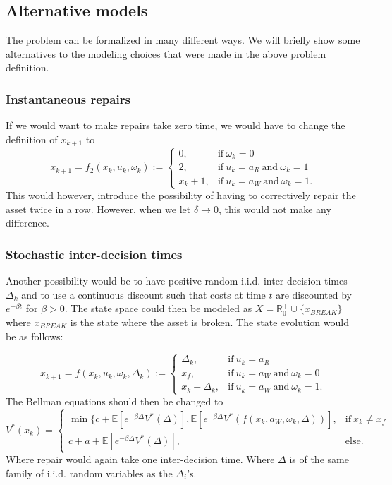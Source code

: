 \subsection{Alternative models}
The problem can be formalized in many different ways.
We will briefly show some alternatives to the modeling choices that were made in the above problem definition.
\subsubsection{Instantaneous repairs}
If we would want to make repairs take zero time, we would have to change the definition of $x_{k+1}$ to 
$$
x_{k+1}=f_2(x_k,u_k,\omega_k):=\begin{cases}
0,&\text{if}\ \omega_k=0 \\
2,&\text{if}\ u_k=a_R\ \text{and}\ \omega_k=1\\
x_k+1,&\text{if}\ u_k=a_W\ \text{and}\ \omega_k=1.
\end{cases}
$$
This would however, introduce the possibility of having to correctively repair the asset twice in a row.
However, when we let $\delta\rightarrow 0$, this would not make any difference.

\subsubsection{Stochastic inter-decision times}
Another possibility would be to have positive random i.i.d. inter-decision times $\Delta_k$ and to use a continuous discount such that costs at time $t$ are discounted by $e^{-\beta t}$ for $\beta>0$.
The state space could then be modeled as $X=\mathbb{R}_0^+\cup\{x_{BREAK}\}$ where $x_{BREAK}$ is the state where the asset is broken.
The state evolution would be as follows:

$$
x_{k+1}=f(x_k,u_k,\omega_k,\Delta_k):=\begin{cases}
\Delta_k,&\text{if}\ u_k=a_R \\
x_f,&\text{if}\ u_k=a_W\ \text{and}\ \omega_k=0 \\
x_k+\Delta_k,&\text{if}\ u_k=a_W\ \text{and}\ \omega_k=1.
\end{cases}
$$
The Bellman equations should then be changed to
$$
V^*(x_k)=\begin{cases}
\min\{c+\mathbb{E}[e^{-\beta \Delta} V^*(\Delta)],\mathbb{E}[e^{-\beta \Delta} V^*(f(x_k,a_W,\omega_k,\Delta))],&\text{if}\ x_k\neq x_f \\
c+a+\mathbb{E}[e^{-\beta \Delta} V^*(\Delta)],&\text{else.}
\end{cases}
$$
Where repair would again take one inter-decision time. Where $\Delta$ is of the same family of i.i.d. random variables as the $\Delta_i$'s.


